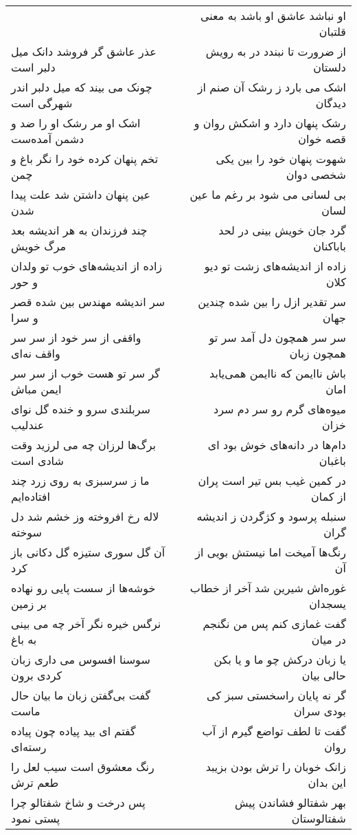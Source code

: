\begin{center}
\begin{longtable}{l p{0.5cm} r}
&&
او نباشد عاشق او باشد به معنی قلتبان
\\
عذر عاشق گر فروشد دانک میل دلبر است
&&
از ضرورت تا نبندد در به رویش دلستان
\\
چونک می بیند که میل دلبر اندر شهرگی است
&&
اشک می بارد ز رشک آن صنم از دیدگان
\\
اشک او مر رشک او را ضد و دشمن آمده‌ست
&&
رشک پنهان دارد و اشکش روان و قصه خوان
\\
تخم پنهان کرده خود را نگر باغ و چمن
&&
شهوت پنهان خود را بین یکی شخصی دوان
\\
عین پنهان داشتن شد علت پیدا شدن
&&
بی لسانی می شود بر رغم ما عین لسان
\\
چند فرزندان به هر اندیشه بعد مرگ خویش
&&
گرد جان خویش بینی در لحد باباکنان
\\
زاده از اندیشه‌های خوب تو ولدان و حور
&&
زاده از اندیشه‌های زشت تو دیو کلان
\\
سر اندیشه مهندس بین شده قصر و سرا
&&
سر تقدیر ازل را بین شده چندین جهان
\\
واقفی از سر خود از سر سر واقف نه‌ای
&&
سر سر همچون دل آمد سر تو همچون زبان
\\
گر سر تو هست خوب از سر سر ایمن مباش
&&
باش ناایمن که ناایمن همی‌یابد امان
\\
سربلندی سرو و خنده گل نوای عندلیب
&&
میوه‌های گرم رو سر دم سرد خزان
\\
برگ‌ها لرزان چه می لرزید وقت شادی است
&&
دام‌ها در دانه‌های خوش بود ای باغبان
\\
ما ز سرسبزی به روی زرد چند افتاده‌ایم
&&
در کمین غیب بس تیر است پران از کمان
\\
لاله رخ افروخته وز خشم شد دل سوخته
&&
سنبله پرسود و کژگردن ز اندیشه گران
\\
آن گل سوری ستیزه گل دکانی باز کرد
&&
رنگ‌ها آمیخت اما نیستش بویی از آن
\\
خوشه‌ها از سست پایی رو نهاده بر زمین
&&
غوره‌اش شیرین شد آخر از خطاب یسجدان
\\
نرگس خیره نگر آخر چه می بینی به باغ
&&
گفت غمازی کنم پس من نگنجم در میان
\\
سوسنا افسوس می داری زبان کردی برون
&&
یا زبان درکش چو ما و یا بکن حالی بیان
\\
گفت بی‌گفتن زبان ما بیان حال ماست
&&
گر نه پایان راسخستی سبز کی بودی سران
\\
گفتم ای بید پیاده چون پیاده رسته‌ای
&&
گفت تا لطف تواضع گیرم از آب روان
\\
رنگ معشوق است سیب لعل را طعم ترش
&&
زانک خوبان را ترش بودن بزیبد این بدان
\\
پس درخت و شاخ شفتالو چرا پستی نمود
&&
بهر شفتالو فشاندن پیش شفتالوستان

\end{longtable}
\end{center}
